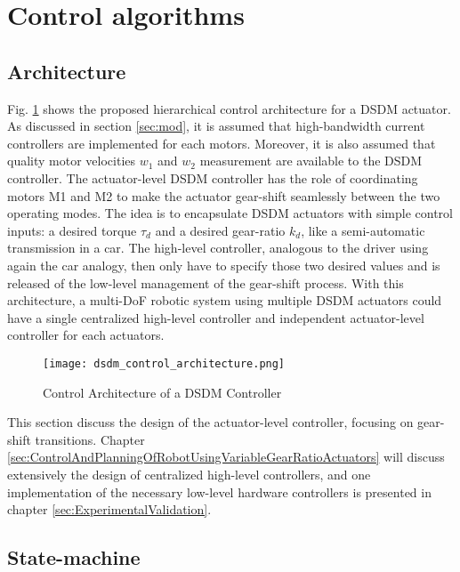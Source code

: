 
\newpage

\section{Control algorithms}

\subsection{Architecture}

Fig. \ref{fig:dsdm_control_architecture} shows the proposed hierarchical control architecture for a DSDM actuator. As discussed in section \ref{sec:mod}, it is assumed that high-bandwidth current controllers are implemented for each motors. Moreover, it is also assumed that quality motor velocities $w_1$ and $w_2$ measurement are available to the DSDM controller. The actuator-level DSDM controller has the role of coordinating motors M1 and M2 to make the actuator gear-shift seamlessly between the two operating modes. The idea is to encapsulate DSDM actuators with simple control inputs: a desired torque $\tau_d$ and a desired gear-ratio $k_d$, like a semi-automatic transmission in a car. The high-level controller, analogous to the driver using again the car analogy, then only have to specify those two desired values and is released of the low-level management of the gear-shift process. With this architecture, a multi-DoF robotic system using multiple DSDM actuators could have a single centralized high-level controller and independent actuator-level controller for each actuators. 

\begin{figure}[H]
	\centering
		\texttt{[image: dsdm\_control\_architecture.png]}
	\caption{Control Architecture of a DSDM Controller}
	\label{fig:dsdm_control_architecture}
\end{figure}

This section discuss the design of the actuator-level controller, focusing on gear-shift transitions. Chapter \ref{sec:ControlAndPlanningOfRobotUsingVariableGearRatioActuators} will discuss extensively the design of centralized high-level controllers, and one implementation of the necessary low-level hardware controllers is presented in chapter \ref{sec:ExperimentalValidation}.


\subsection{State-machine}


